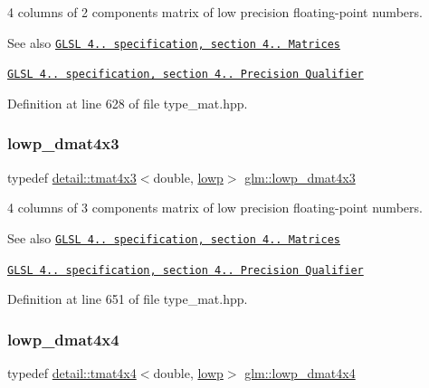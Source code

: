 4 columns of 2 components matrix of low precision floating-\/point numbers.

\begin{DoxySeeAlso}{See also}
\href{http://www.opengl.org/registry/doc/GLSLangSpec.4.20.8.pdf}{\tt G\+L\+SL 4.. specification, section 4.. Matrices} 

\href{http://www.opengl.org/registry/doc/GLSLangSpec.4.20.8.pdf}{\tt G\+L\+SL 4.. specification, section 4.. Precision Qualifier} 
\end{DoxySeeAlso}


Definition at line 628 of file type\+\_\+mat.\+hpp.

\mbox{\label{group__core__precision_gabc1be51eb0cae7cd4b1d6483a954c35d}} 
\subsubsection{\texorpdfstring{lowp\+\_\+dmat4x3}{lowp\_dmat4x3}}
{\footnotesize\ttfamily typedef \hyperlink{structglm_1_1detail_1_1tmat4x3}{detail\+::tmat4x3}$<$double, \hyperlink{namespaceglm_a0f04f086094c747d227af4425893f545ae161af3fc695e696ce3bf69f7332bc2d}{lowp}$>$ \hyperlink{group__core__precision_gabc1be51eb0cae7cd4b1d6483a954c35d}{glm\+::lowp\+\_\+dmat4x3}}

4 columns of 3 components matrix of low precision floating-\/point numbers.

\begin{DoxySeeAlso}{See also}
\href{http://www.opengl.org/registry/doc/GLSLangSpec.4.20.8.pdf}{\tt G\+L\+SL 4.. specification, section 4.. Matrices} 

\href{http://www.opengl.org/registry/doc/GLSLangSpec.4.20.8.pdf}{\tt G\+L\+SL 4.. specification, section 4.. Precision Qualifier} 
\end{DoxySeeAlso}


Definition at line 651 of file type\+\_\+mat.\+hpp.

\mbox{\label{group__core__precision_gac762dec40f53114dfe6894499a2c9a79}} 
\subsubsection{\texorpdfstring{lowp\+\_\+dmat4x4}{lowp\_dmat4x4}}
{\footnotesize\ttfamily typedef \hyperlink{structglm_1_1detail_1_1tmat4x4}{detail\+::tmat4x4}$<$double, \hyperlink{namespaceglm_a0f04f086094c747d227af4425893f545ae161af3fc695e696ce3bf69f7332bc2d}{lowp}$>$ \hyperlink{group__core__precision_gac762dec40f53114dfe6894499a2c9a79}{glm\+::lowp\+\_\+dmat4x4}}

